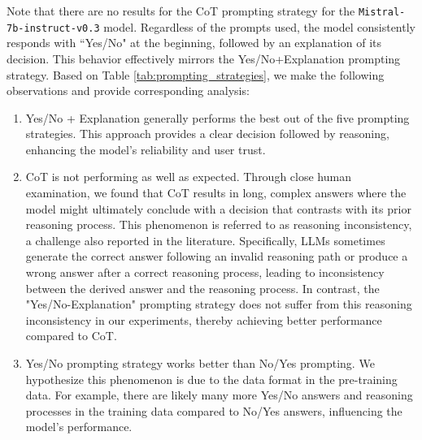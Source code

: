 Note that there are no results for the CoT prompting strategy for the \texttt{Mistral-7b-instruct-v0.3} model. Regardless of the prompts used, the model consistently responds with ``Yes/No" at the beginning, followed by an explanation of its decision. This behavior effectively mirrors the Yes/No+Explanation prompting strategy. Based on Table \ref{tab:prompting_strategies}, we make the following observations and provide corresponding analysis:
\begin{enumerate} 
\item Yes/No + Explanation generally performs the best out of the five prompting strategies. This approach provides a clear decision followed by reasoning, enhancing the model's reliability and user trust. 
\item CoT is not performing as well as expected. Through close human examination, we found that CoT results in long, complex answers where the model might ultimately conclude with a decision that contrasts with its prior reasoning process. This phenomenon is referred to as reasoning inconsistency, a challenge also reported in the literature\citep{wei2022chain,lyu2023faithful}. Specifically, LLMs sometimes generate the correct answer following an invalid reasoning path or produce a wrong answer after a correct reasoning process, leading to inconsistency between the derived answer and the reasoning process. In contrast, the "Yes/No-Explanation" prompting strategy does not suffer from this reasoning inconsistency in our experiments, thereby achieving better performance compared to CoT.
\item Yes/No prompting strategy works better than No/Yes prompting. We hypothesize this phenomenon is due to the data format in the pre-training data. For example, there are likely many more Yes/No answers and reasoning processes in the training data compared to No/Yes answers, influencing the model's performance. 
\end{enumerate}

